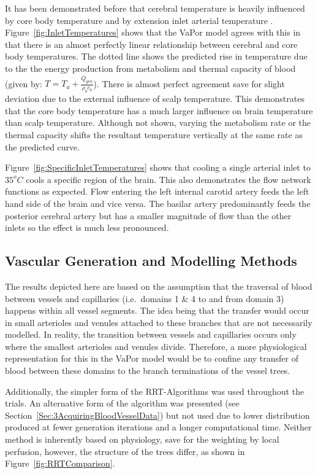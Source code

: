 \documentclass[11pt,english,a4paper,twoside,openright]{report}
\begin{document}
{{{{{{{{It has been demonstrated before that cerebral temperature is heavily influenced by core body temperature and by extension inlet arterial temperature \cite{konstas2007theoretical}\cite{van2000numerical}. Figure~\ref{fig:InletTemperatures} shows that the VaPor model agrees with this in that there is an almost perfectly linear relationship between cerebral and core body temperatures. The dotted line shows the predicted rise in temperature due to the the energy production from metabolism and thermal capacity of blood (given by: $T = T_{a}+\frac{\overline{Q}_{gen}}{\rho_{b}c_{b}}$). There is almost perfect agreement save for slight deviation due to the external influence of scalp temperature. This demonstrates that the core body temperature has a much larger influence on brain temperature than scalp temperature. Although not shown, varying the metabolism rate or the thermal capacity shifts the resultant temperature vertically at the same rate as the predicted curve. 

Figure~\ref{fig:SpecificInletTemperatures} shows that cooling a single arterial inlet to $35^{o}C$ cools a specific region of the brain. This also demonstrates the flow network functions as expected. Flow entering the left internal carotid artery feeds the left hand side of the brain and vice versa. The basilar artery predominantly feeds the posterior cerebral artery but has a smaller magnitude of flow than the other inlets so the effect is much less pronounced. 

\subsection{Vascular Generation and Modelling Methods}

The results depicted here are based on the assumption that the traversal of blood between vessels and capillaries (i.e.\ domains 1 \& 4 to and from domain 3) happens within all vessel segments. The idea being that the transfer would occur in small arterioles and venules attached to these branches that are not necessarily modelled. In reality, the transition between vessels and capillaries occurs only where the smallest arterioles and venules divide. Therefore, a more physiological representation for this in the VaPor model would be to confine any transfer of blood between these domains to the branch terminations of the vessel trees. 

Additionally, the simpler form of the RRT-Algorithms was used throughout the trials. An alternative form of the algorithm was presented (see Section~\ref{Sec:3AcquiringBloodVesselData}) but not used due to lower distribution  produced at fewer generation iterations and a longer computational time. Neither method is inherently based on physiology, save for the weighting by local perfusion, however, the structure of the trees differ, as shown in Figure~\ref{fig:RRTComparison}.

}}}}}}}}
\end{document}
